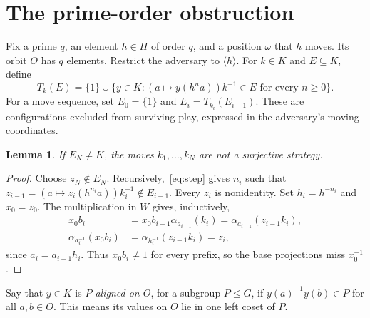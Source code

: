 \documentclass[11pt]{article}
\newtheorem{lemma}[theorem]{Lemma}
\newcommand{\al}{\alpha}
\begin{document}
\section{The prime-order obstruction}
Fix a prime $q$, an element $h\in H$ of order $q$, and a position $\omega$
that $h$ moves. Its orbit $O$ has $q$ elements. Restrict the adversary to
$\langle h\rangle$. For $k\in K$ and $E\subseteq K$, define
\begin{equation}\label{eq:step}
 T_k(E)=\{1\}\cup
 \{y\in K:(a\mapsto y(h^na))k^{-1}\in E\text{ for every }n\geq0\}.
\end{equation}
For a move sequence, set $E_0=\{1\}$ and $E_i=T_{k_i}(E_{i-1})$.
These are configurations excluded from surviving play, expressed in the
adversary's moving coordinates.

\begin{lemma}\label{lem:back}
If $E_N\neq K$, the moves $k_1,\ldots,k_N$ are not a surjective strategy.
\end{lemma}
\begin{proof}
Choose $z_N\notin E_N$. Recursively,~\eqref{eq:step} gives $n_i$ such that
$z_{i-1}=(a\mapsto z_i(h^{n_i}a))k_i^{-1}\notin E_{i-1}$.
Every $z_i$ is nonidentity. Set $h_i=h^{-n_i}$ and $x_0=z_0$.
The multiplication in $W$ gives, inductively,
\begin{equation}\label{eq:moving}
\begin{aligned}
 x_0b_i &= x_0b_{i-1}\al_{a_{i-1}}(k_i)
          = \al_{a_{i-1}}(z_{i-1}k_i),\\
 \al_{a_i^{-1}}(x_0b_i)
        &= \al_{h_i^{-1}}(z_{i-1}k_i)=z_i,
\end{aligned}
\end{equation}
since $a_i=a_{i-1}h_i$. Thus $x_0b_i\neq1$ for every prefix,
so the base projections miss $x_0^{-1}$.
\end{proof}

Say that $y\in K$ is \emph{$P$-aligned on $O$}, for a subgroup $P\leq G$,
if $y(a)^{-1}y(b)\in P$ for all $a,b\in O$. This means its values on $O$
lie in one left coset of $P$.
\end{document}
